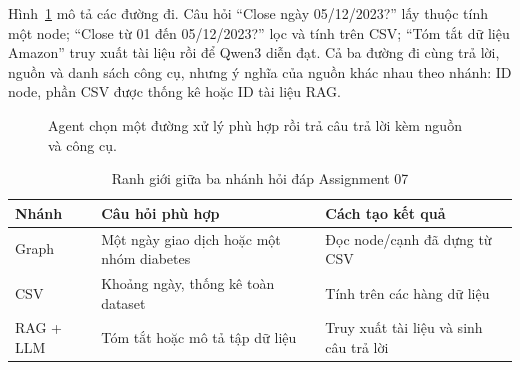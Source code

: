 \documentclass[12pt,a4paper]{report}
\begin{document}
Hình~\ref{fig:essay03-agent-flow} mô tả các đường đi. Câu hỏi ``Close ngày 05/12/2023?'' lấy thuộc tính một node; ``Close từ 01 đến 05/12/2023?'' lọc và tính trên CSV; ``Tóm tắt dữ liệu Amazon'' truy xuất tài liệu rồi để Qwen3 diễn đạt. Cả ba đường đi cùng trả lời, nguồn và danh sách công cụ, nhưng ý nghĩa của nguồn khác nhau theo nhánh: ID node, phần CSV được thống kê hoặc ID tài liệu RAG.
\begin{figure}[htbp]\centering\color{black}
\caption{Agent chọn một đường xử lý phù hợp rồi trả câu trả lời kèm nguồn và công cụ.}\label{fig:essay03-agent-flow}
\end{figure}

\begin{table}[htbp]\centering\color{black}
\caption{Ranh giới giữa ba nhánh hỏi đáp Assignment 07}\label{tab:essay03-agent}
\begin{tabularx}{\textwidth}{>{\raggedright\arraybackslash}p{2.4cm}>{\raggedright\arraybackslash}X>{\raggedright\arraybackslash}X}
\toprule
\textbf{Nhánh} & \textbf{Câu hỏi phù hợp} & \textbf{Cách tạo kết quả}\\
\midrule
Graph & Một ngày giao dịch hoặc một nhóm diabetes & Đọc node/cạnh đã dựng từ CSV\\
CSV & Khoảng ngày, thống kê toàn dataset & Tính trên các hàng dữ liệu\\
RAG + LLM & Tóm tắt hoặc mô tả tập dữ liệu & Truy xuất tài liệu và sinh câu trả lời\\
\bottomrule
\end{tabularx}
\end{table}
\end{document}
